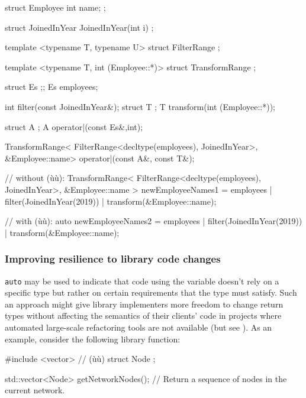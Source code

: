 \begin{emcppshiddenlisting}[emcppsbatch=e10]
struct Employee {
  int name;
};

struct JoinedInYear {
JoinedInYear(int i) {}
};

template <typename T, typename U>
struct FilterRange {};

template <typename T, int (Employee::*)>
struct TransformRange {};

struct Es {};;
Es employees;

int filter(const JoinedInYear&);
struct T {};
T transform(int (Employee::*));

struct A {};
A operator|(const Es&,int);

TransformRange<
    FilterRange<decltype(employees), JoinedInYear>,
    &Employee::name>
operator|(const A&, const T&);

\end{emcppshiddenlisting}
\begin{emcppslisting}[emcppsbatch=e10]
// without (ù{}ù):
TransformRange<
    FilterRange<decltype(employees), JoinedInYear>,
    &Employee::name
> newEmployeeNames1 =
    employees | filter(JoinedInYear(2019))
              | transform(&Employee::name);

// with (ù{}ù):
auto newEmployeeNames2 =
    employees | filter(JoinedInYear(2019))
              | transform(&Employee::name);
\end{emcppslisting}


\subsubsection[Improving resilience to library code changes]{Improving resilience to library code changes}\label{improving-resilience-to-library-code-changes}

\lstinline!auto! may be used to indicate that code using the variable
doesn't rely on a specific type but rather on certain requirements that
the type must satisfy. Such an approach might give library implementers
more freedom to change return types without affecting the semantics of
their clients' code in projects where automated large-scale refactoring
tools are not available (but see ). As an example,
consider the following library function:

\begin{emcppshiddenlisting}[emcppsbatch=e11]
#include <vector>     // (ù{}ù)
struct Node {};
\end{emcppshiddenlisting}
\begin{emcppslisting}[emcppsbatch=e11]
std::vector<Node> getNetworkNodes();
    // Return a sequence of nodes in the current network.
\end{emcppslisting}


